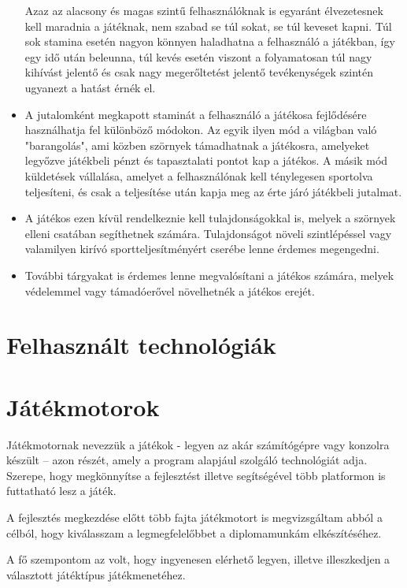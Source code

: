 \begin{itemize}
	Azaz az alacsony és magas szintű felhasználóknak is egyaránt élvezetesnek kell maradnia a játéknak, nem szabad se túl sokat, se túl keveset kapni. 
	Túl sok stamina esetén nagyon könnyen haladhatna a felhasználó a játékban, így egy idő után beleunna, túl kevés esetén viszont a folyamatosan túl nagy kihívást jelentő és csak nagy megerőltetést jelentő tevékenységek szintén ugyanezt a hatást érnék el.
	\item 
	A jutalomként megkapott staminát a felhasználó a játékosa fejlődésére használhatja fel különböző módokon. 
	Az egyik ilyen mód a világban való "barangolás", ami közben szörnyek támadhatnak a játékosra, amelyeket legyőzve játékbeli pénzt és tapasztalati pontot kap a játékos. 
	A másik mód küldetések vállalása, amelyet a felhasználónak kell ténylegesen sportolva teljesíteni, és csak a teljesítése után kapja meg az érte járó játékbeli jutalmat.
	\item 
	A játékos ezen kívül rendelkeznie kell tulajdonságokkal is, melyek a szörnyek elleni csatában segíthetnek számára. 
	Tulajdonságot növeli szintlépéssel vagy valamilyen kirívó sportteljesítményért cserébe lenne érdemes megengedni.
	\item 
	További tárgyakat is érdemes lenne megvalósítani a játékos számára, melyek védelemmel vagy támadóerővel növelhetnék a játékos erejét.
\end{itemize}


\section{Felhasznált technológiák}
\label{felhtechnologia}

\section*{Játékmotorok}
\label{jatekmotor}

Játékmotornak nevezzük a játékok - legyen az akár számítógépre vagy konzolra készült – azon részét, amely a program alapjául szolgáló technológiát adja. 
Szerepe, hogy megkönnyítse a fejlesztést illetve segítségével több platformon is futtatható lesz a játék.

A fejlesztés megkezdése előtt több fajta játékmotort is megvizsgáltam abból a célból, hogy kiválasszam a legmegfelelőbbet a diplomamunkám elkészítéséhez. 

A fő szempontom az volt, hogy ingyenesen elérhető legyen, illetve illeszkedjen a választott játéktípus játékmenetéhez.

